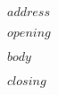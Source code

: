 \documentclass[$campus$,$dept$,$if(fontsize)$$fontsize$,$endif$]{ucletter}
\begin{document}
\begin{letter}{
   $address$
 }


 \opening{$opening$}

$body$
 
 \closing{$closing$}
\end{letter}
\end{document}
